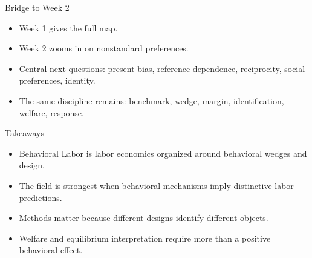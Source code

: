 \documentclass[aspectratio=169,11pt]{beamer}
\begin{document}
\begin{frame}{Bridge to Week 2}
\begin{itemize}
    \item Week 1 gives the full map.
    \item Week 2 zooms in on nonstandard preferences.
    \item Central next questions: present bias, reference dependence, reciprocity, social preferences, identity.
    \item The same discipline remains: benchmark, wedge, margin, identification, welfare, response.
\end{itemize}
\end{frame}

\begin{frame}{Takeaways}
\begin{itemize}
    \item Behavioral Labor is labor economics organized around behavioral wedges and design.
    \item The field is strongest when behavioral mechanisms imply distinctive labor predictions.
    \item Methods matter because different designs identify different objects.
    \item Welfare and equilibrium interpretation require more than a positive behavioral effect.
\end{itemize}
\end{frame}
\end{document}

